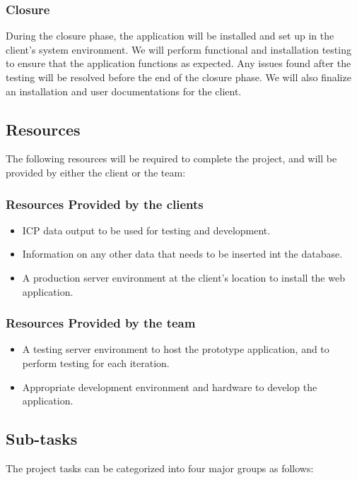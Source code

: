 \documentclass[10pt,twocolumn,letterpaper]{article}
\begin{document}
                \subsubsection{Closure}
                During the closure phase, the application will be installed and set up in the client's system environment. 
                We will perform functional and installation testing to ensure that the application functions as expected. 
                Any issues found after the testing will be resolved before the end of the closure phase. We will also finalize an installation and user documentations for the client.
            \subsection{Resources}

            The following resources will be required to complete the project, and will be provided by either the client or the team:
                \subsubsection{Resources Provided by the clients}
                \begin{itemize}
                  \item ICP data output to be used for testing and development.
                  \item Information on any other data that needs to be inserted int the database.
                  \item A production server environment at the client's location to install the web application.
                \end{itemize}
                \subsubsection{Resources Provided by the team}
                \begin{itemize}
                  \item A testing server environment to host the prototype application, and to perform testing for each iteration.
                  \item Appropriate development environment and hardware to develop the application.
                \end{itemize}
            \subsection{Sub-tasks}
            The project tasks can be categorized into four major groups as follows:
\end{document}
